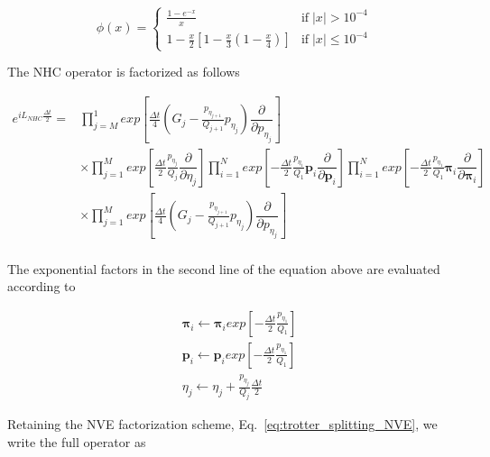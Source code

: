 \documentclass[aip,jcp,reprint,amsmath,amssymb]{revtex4-1}
\newcommand{\vt}[1]{\boldsymbol{\mathbf{#1}}}           %
\newcommand{\diff}[2]{\dfrac{\partial #1}{\partial #2}} %
\begin{document}
\begin{equation}
\label{eq:phi}
\phi(x) = \begin{cases}
\frac{1-e^{-x}}{x} & \text{if} \; |x| > 10^{-4} \\
1 - \frac{x}{2}\left[1 - \frac{x}{3}\left(1 - \frac{x}{4}\right) \right] & \text{if} \; |x| \leq 10^{-4}
\end{cases}
\end{equation}

The NHC operator is factorized as follows
\\

\begin{widetext}
\begin{equation}
\begin{split}
e^{iL_{NHC} \frac{\Delta t}{2}} =  &\prod_{j=M}^{1} exp\left[\frac{\Delta t}{4} \left( G_j - \frac{p_{\eta_{j+1}}}{Q_{j+1}} p_{\eta_j} \right) \diff{}{p_{\eta_j}}\right] \\
&  \times \prod_{j=1}^{M} exp\left[\frac{\Delta t}{2} \frac{p_{\eta_j}}{Q_j}\diff{}{\eta_j}\right]  \prod_{i=1}^{N} exp\left[-\frac{\Delta t}{2} \frac{p_{\eta_1}}{Q_1}\vt p_i \diff{}{\vt p_i}\right] \prod_{i=1}^{N} exp\left[-\frac{\Delta t}{2} \frac{p_{\eta_1}}{Q_1}\vt \pi_i \diff{}{\vt \pi_i}\right]  \\
& \times \prod_{j=1}^{M} exp\left[\frac{\Delta t}{4} \left( G_j - \frac{p_{\eta_{j+1}}}{Q_{j+1}} p_{\eta_j} \right) \diff{}{p_{\eta_j}}\right]  \\
\end{split}
\end{equation}
\end{widetext}

The exponential factors in the second line of the equation above are evaluated according to

\begin{equation}
\begin{split}
&\vt \pi_i \leftarrow \vt \pi_i  exp\left[-\frac{\Delta t}{2}\frac{p_{\eta_1}}{Q_1}\right]\\
&\vt p_i \leftarrow \vt p_i  exp\left[-\frac{\Delta t}{2}\frac{p_{\eta_1}}{Q_1}\right]\\
&\eta_j  \leftarrow \eta_j + \frac{p_{\eta_j}}{ Q_j} \frac{\Delta t}{2} 
\end{split}
\end{equation}

Retaining the NVE factorization scheme, Eq.~\ref{eq:trotter_splitting_NVE}, we write the full operator as
\end{document}
